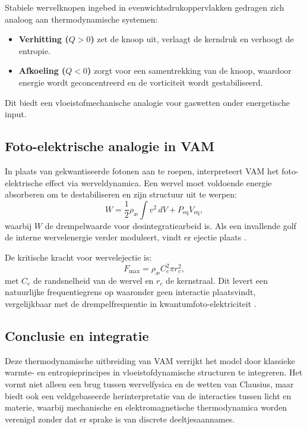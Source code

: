 Stabiele wervelknopen ingebed in evenwichtsdrukoppervlakken gedragen zich analoog aan thermodynamische systemen:
\begin{itemize}
\item \textbf{Verhitting ($Q > 0$)} zet de knoop uit, verlaagt de kerndruk en verhoogt de entropie. \item \textbf{Afkoeling ($Q < 0$)} zorgt voor een samentrekking van de knoop, waardoor energie wordt geconcentreerd en de vorticiteit wordt gestabiliseerd.
\end{itemize}
Dit biedt een vloeistofmechanische analogie voor gaswetten onder energetische input.

\subsection{Foto-elektrische analogie in VAM}

In plaats van gekwantiseerde fotonen aan te roepen, interpreteert VAM het foto-elektrische effect via werveldynamica. Een wervel moet voldoende energie absorberen om te destabiliseren en zijn structuur uit te werpen:
\begin{equation}
W = \frac{1}{2} \rho_{\text{\ae}} \int v^2 \, dV + P_{\text{eq}} V_{\text{eq}},\label{eq:foto-elektrische_arbeid}
\end{equation}
waarbij $W$ de drempelwaarde voor desintegratiearbeid is. Als een invallende golf de interne wervelenergie verder moduleert, vindt er ejectie plaats \cite{vam2025unified}.

De kritische kracht voor wervelejectie is:
\begin{equation}
F_{\max} = \rho_{\text{\ae}} C_e^2 \pi r_c^2,\label{eq:critical_force}
\end{equation}
met $C_e$ de randsnelheid van de wervel en $r_c$ de kernstraal. Dit levert een natuurlijke frequentiegrens op waaronder geen interactie plaatsvindt, vergelijkbaar met de drempelfrequentie in kwantumfoto-elektriciteit \cite{einstein1905photoelectric}.

\subsection*{Conclusie en integratie}

Deze thermodynamische uitbreiding van VAM verrijkt het model door klassieke warmte- en entropieprincipes in vloeistofdynamische structuren te integreren. Het vormt niet alleen een brug tussen wervelfysica en de wetten van Clausius, maar biedt ook een veldgebaseerde herinterpretatie van de interacties tussen licht en materie, waarbij mechanische en elektromagnetische thermodynamica worden verenigd zonder dat er sprake is van discrete deeltjesaannames.
